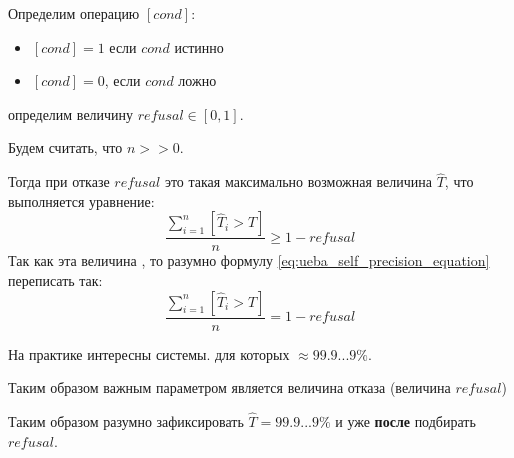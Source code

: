 \begin{frame}
	\small
	Определим операцию $[cond]$: 
	\begin{itemize}
		\item $[cond]=1$ если $cond$ истинно 
		\item $[cond]=0$, если $cond$ ложно
	\end{itemize}
	
	определим величину $refusal \in [0, 1]$.
	
	Будем считать, что $n >> 0$.
	
	Тогда  при отказе $refusal$ это такая максимально
	возможная величина $\hat T$, что выполняется уравнение:
	\begin{equation}\label{eq:ueba_self_precision_equation}
	\frac{\sum_{i=1}^{n} \left[\hat T_i > 
		\hat T\right]}{n} \geqslant 1 -  refusal
	\end{equation}
	Так как эта величина , то
	разумно формулу \eqref{eq:ueba_self_precision_equation} 
	переписать так:
	\begin{equation}
	\frac{\sum_{i=1}^{n} \left[\hat T_i > 
		\hat T\right]}{n} = 1 -  refusal
	\end{equation}
	
\end{frame}

\begin{frame}
	\Large
	На практике интересны системы. для которых 
	 $ \approx 99.9...9\%$.
	
	\begin{center}
	\end{center}
	Таким образом важным параметром является величина отказа
	(величина $refusal$)
	
	Таким образом разумно зафиксировать 
	$ \hat T = 99.9...9\%$ и уже \textbf{после}
	подбирать $refusal$.
	
\end{frame}

